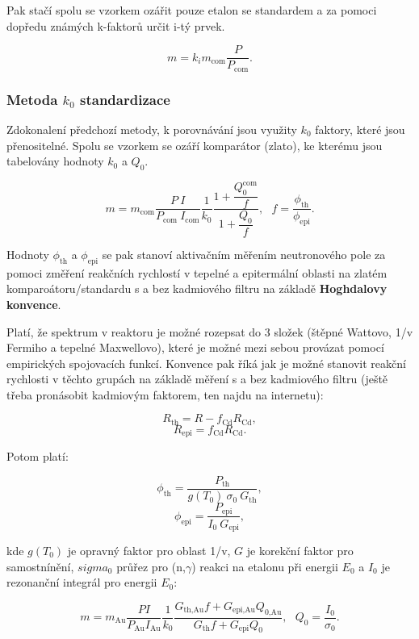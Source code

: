 Pak stačí spolu se vzorkem ozářit pouze etalon se standardem a za pomoci dopředu známých k-faktorů určit i-tý prvek.

\begin{equation}
    \boxed{
        m = k_i m_\text{com} \dfrac{P}{P_\text{com}}.
    }
\end{equation}

\subsubsection{Metoda $k_0$ standardizace}

Zdokonalení předchozí metody, k porovnávání jsou využity $k_0$ faktory, které jsou přenositelné. Spolu se vzorkem se ozáří komparátor (zlato), ke kterému jsou tabelovány hodnoty $k_0$ a $Q_0$.

\begin{equation}
    \boxed{
        m = m_\text{com} \dfrac{P \: I}{P_\text{com} \: I_\text{com}} \dfrac{1}{k_0} \dfrac{1 + \dfrac{Q_0^\text{com}}{f}}{1 + \dfrac{Q_0}{f}}, \: \: \: f = \dfrac{\phi_\text{th}}{\phi_\text{epi}}.
    }
\end{equation}

Hodnoty $\phi_\text{th}$ a $\phi_\text{epi}$ se pak stanoví aktivačním měřením neutronového pole za pomoci změření reakčních rychlostí v tepelné a epitermální oblasti na zlatém komparoátoru/standardu s a bez kadmiového filtru na základě \textbf{Hoghdalovy konvence}.

Platí, že spektrum v reaktoru je možné rozepsat do 3 složek (štěpné Wattovo, 1/v Fermiho a tepelné Maxwellovo), které je možné mezi sebou provázat pomocí empirických spojovacích funkcí. Konvence pak říká jak je možné stanovit reakční rychlosti v těchto grupách na základě měření s a bez kadmiového filtru (ještě třeba pronásobit kadmiovým faktorem, ten najdu na internetu):

$$ R_\text{th} = R - f_\text{Cd}R_\text{Cd}, $$
$$ R_\text{epi} = f_\text{Cd}R_\text{Cd}. $$

Potom platí:

$$ \phi_\text{th} = \dfrac{P_\text{th}}{g(T_0) \: \sigma_0 \: G_\text{th}}, $$
$$ \phi_\text{epi} = \dfrac{P_\text{epi}}{I_0 \: G_\text{epi}}, $$

kde $g(T_0)$ je opravný faktor pro oblast 1/v, $G$ je korekční faktor pro samostnínění, $sigma_0$ průřez pro (n,$\gamma$) reakci na etalonu při energii $E_0$ a $I_0$ je rezonanční integrál pro energii $E_0$:

\begin{equation}
    \boxed{
        m = m_\text{Au} \dfrac{P I}{P_\text{Au} I_\text{Au}} \dfrac{1}{k_0} \dfrac{G_\text{th,Au} f + G_\text{epi,Au} Q_{0\text{,Au}}}{G_\text{th} f + G_\text{epi} Q_{0}}, \: \: \: Q_0 = \dfrac{I_0}{\sigma_0}.
    }
\end{equation}

